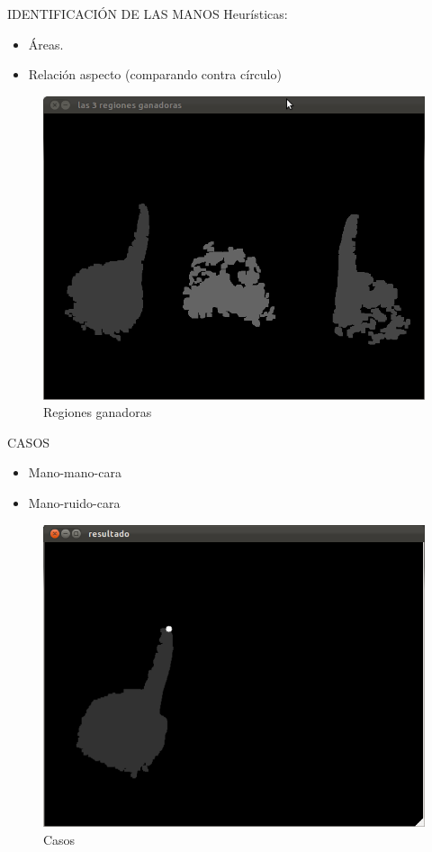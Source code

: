\documentclass{beamer}
\begin{document}
\begin{frame}{IDENTIFICACIÓN DE LAS MANOS}
	Heurísticas:
	\begin{itemize}
		\item Áreas.
		\item Relación aspecto (comparando contra círculo)
	\end{itemize}

	\begin{figure}[tbhp]
	\centerline{\includegraphics[scale=0.2]{5_3_regiones_ganadoras}}
	\caption{Regiones ganadoras}
	\label{fig:ganadoras}
	\end{figure}

\end{frame}

\begin{frame}{CASOS}
	\begin{itemize}
		\item Mano-mano-cara
		\item Mano-ruido-cara
	\end{itemize}

	\begin{figure}[tbhp]
	\centerline{\includegraphics[scale=0.2]{6_resultado_final}}
	\caption{Casos}
	\label{fig:casos}
	\end{figure}
\end{frame}
\end{document}
